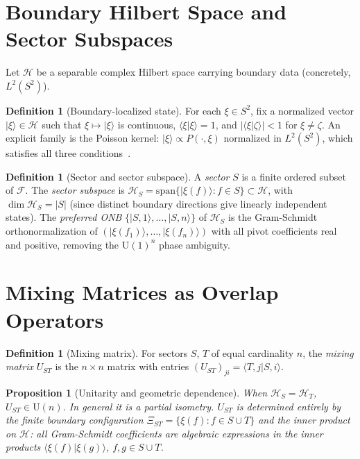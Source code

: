 \documentclass[11pt,a4paper]{article}
\newtheorem{proposition}[theorem]{Proposition}
\theoremstyle{definition}
\newtheorem{definition}[theorem]{Definition}
\theoremstyle{remark}
\begin{document}
\section{Boundary Hilbert Space and Sector Subspaces}

Let $\mathcal{H}$ be a separable complex Hilbert space carrying
boundary data (concretely, $L^2(S^2)$).

\begin{definition}[Boundary-localized state]
For each $\xi\in S^2$, fix a normalized vector $|\xi\rangle\in\mathcal{H}$
such that $\xi\mapsto|\xi\rangle$ is continuous, $\langle\xi|\xi\rangle=1$,
and $|\langle\xi|\zeta\rangle|<1$ for $\xi\neq\zeta$.
An explicit family is the Poisson kernel:
$|\xi\rangle\propto P(\cdot,\xi)$ normalized in $L^2(S^2)$,
which satisfies all three conditions~\cite{Ratcliffe}.
\end{definition}

\begin{definition}[Sector and sector subspace]
A \emph{sector} $S$ is a finite ordered subset of $\mathcal{F}$.
The \emph{sector subspace} is
$\mathcal{H}_S = \mathrm{span}\{|\xi(f)\rangle : f\in S\}\subset\mathcal{H}$,
with $\dim\mathcal{H}_S=|S|$ (since distinct boundary directions give
linearly independent states).
The \emph{preferred ONB} $\{|S,1\rangle,\ldots,|S,n\rangle\}$ of
$\mathcal{H}_S$ is the Gram-Schmidt orthonormalization of
$(|\xi(f_1)\rangle,\ldots,|\xi(f_n)\rangle)$ with all pivot
coefficients real and positive, removing the $\mathrm{U}(1)^n$
phase ambiguity.
\end{definition}

\section{Mixing Matrices as Overlap Operators}

\begin{definition}[Mixing matrix]
For sectors $S$, $T$ of equal cardinality $n$, the
\emph{mixing matrix} $U_{ST}$ is the $n\times n$ matrix with
entries $(U_{ST})_{ji}=\langle T,j|S,i\rangle$.
\end{definition}

\begin{proposition}[Unitarity and geometric dependence]
\label{prop:unitary}
When $\mathcal{H}_S=\mathcal{H}_T$, $U_{ST}\in\mathrm{U}(n)$.
In general it is a partial isometry.
$U_{ST}$ is determined entirely by the finite boundary
configuration $\Xi_{ST}=\{\xi(f):f\in S\cup T\}$ and the inner
product on $\mathcal{H}$: all Gram-Schmidt coefficients are
algebraic expressions in the inner products
$\langle\xi(f)|\xi(g)\rangle$, $f,g\in S\cup T$.
\end{proposition}
\end{document}
